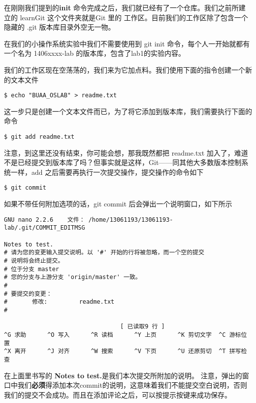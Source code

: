 在刚刚我们提到的\textbf{init} 命令完成之后，我们就已经有了一个仓库。我们之前所建立的 learnGit 这个文件夹就是Git 里的 工作区。目前我们的工作区除了包含一个隐藏的 .git 版本库目录外空无一物。

\begin{note}
在我们的小操作系统实验中我们不需要使用到 git init 命令，每个人一开始就都有一个名为 1406xxxx-lab 的版本库，包含了lab1的实验内容。
\end{note}

我们的工作区现在空荡荡的，我们来为它加点料。我们使用下面的指令创建一个新的文本文件
\begin{verbatim}
$ echo "BUAA_OSLAB" > readme.txt
\end{verbatim}

这一步只是创建一个文本文件而已，为了将它添加到版本库，我们需要执行下面的命令

\begin{verbatim}
$ git add readme.txt
\end{verbatim}
\label{git add}
注意，到这里还没有结束，你可能会想，那我既然都把 readme.txt 加入了，难道不是已经提交到版本库了吗？但事实就是这样，Git——同其他大多数版本控制系统一样，add 之后需要再执行一次提交操作，提交操作的命令如下

\begin{verbatim}
$ git commit
\end{verbatim}

如果不带任何附加选项的话，git commit 后会弹出一个说明窗口，如下所示

\begin{verbatim}
GNU nano 2.2.6    文件： /home/13061193/13061193-lab/.git/COMMIT_EDITMSG              

Notes to test.
# 请为您的变更输入提交说明。以 '#' 开始的行将被忽略，而一个空的提交
# 说明将会终止提交。
# 位于分支 master
# 您的分支与上游分支 'origin/master' 一致。
#
# 要提交的变更：
#       修改:         readme.txt
#

                                 [ 已读取9 行 ]
^G 求助      ^O 写入      ^R 读档      ^Y 上页      ^K 剪切文字  ^C 游标位置
^X 离开      ^J 对齐      ^W 搜索      ^V 下页      ^U 还原剪切  ^T 拼写检查
\end{verbatim}


在上面里书写的 \textbf{Notes to test.}是我们本次提交所附加的说明。
注意，弹出的窗口中我们\textbf{必须}得添加本次commit的说明，这意味着我们不能提交空白说明，否则我们的提交不会成功。而且在添加评论之后，可以按提示按键来成功保存。

